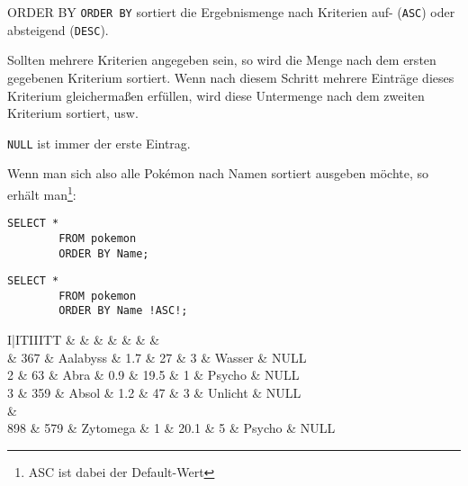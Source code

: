 \begin{sql}{ORDER BY}
    \texttt{ORDER BY} sortiert die Ergebnismenge nach Kriterien auf- (\texttt{ASC}) oder absteigend (\texttt{DESC}).

    Sollten mehrere Kriterien angegeben sein, so wird die Menge nach dem ersten gegebenen Kriterium sortiert.
    Wenn nach diesem Schritt mehrere Einträge dieses Kriterium gleichermaßen erfüllen, wird diese Untermenge nach dem zweiten Kriterium sortiert, usw.

    \texttt{NULL} ist immer der erste Eintrag.

    Wenn man sich also alle Pokémon nach Namen sortiert ausgeben möchte, so erhält man\footnote{ASC ist dabei der Default-Wert}:

    \begin{lstlisting}[language=mysql]
        SELECT *
        FROM pokemon
        ORDER BY Name;
    \end{lstlisting}

    \begin{lstlisting}[language=mysql]
        SELECT *
        FROM pokemon
        ORDER BY Name !ASC!;
    \end{lstlisting}

    \setcounter{rownum}{0}
    \begin{tabular}{I|ITIIITT}
                                   &     &  &  &  &  &  &  \\                          & 367                       & Aalabyss                 & 1.7                         & 27                          & 3                              & Wasser                         & NULL                             \\
        2                          & 63                        & Abra                     & 0.9                         & 19.5                        & 1                              & Psycho                         & NULL                             \\
        3                          & 359                       & Absol                    & 1.2                         & 47                          & 3                              & Unlicht                        & NULL                             \\
         &                                                                                                                                                                                              \\
        898                        & 579                       & Zytomega                 & 1                           & 20.1                        & 5                              & Psycho                         & NULL                             \\
    \end{tabular}
    \vspace{1em}


\end{sql}
